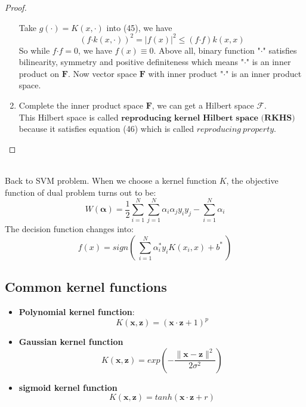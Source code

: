 \begin{proof}
\begin{enumerate}
      Take $g(\cdot)=K(x,\cdot)$ into (45), we have
      $$ (f\bm\cdot k(x,\cdot))^2=|f(x)|^2\leqslant(f\bm\cdot f)k(x,x) $$
      So while $f\bm\cdot f=0$, we have $f(x)\equiv 0$.
      Above all, binary function "$\bm\cdot$" satisfies bilinearity, symmetry and positive definiteness which means "$\bm\cdot$" is an inner product on $\bm{F}$. Now vector space $\bm{F}$ with inner product "$\bm\cdot$" is an inner product space.
   \item Complete the inner product space $\bm{F}$, we can get a Hilbert space $\mathscr{F}$.\\
      This Hilbert space is called $\textbf{reproducing\ kernel\ Hilbert\ space\ (RKHS)}$ because it satisfies equation (46) which is called $reproducing\ property$.
 \end{enumerate}
\end{proof}
\noindent\\
Back to SVM problem. When we choose a kernel function $K$, the objective function of dual problem turns out to be:
$$ W(\bm\alpha)=\frac{1}{2}\sum_{i=1}^{N}\sum_{j=1}^{N}\alpha_{i}\alpha_{j}y_{i}y_{j}-\sum_{i=1}^{N}\alpha_{i} $$
The decision function changes into:
$$ f(x)=sign(\ \sum_{i=1}^{N}\alpha_{i}^*y_{i}K(x_{i},x)+b^*\ ) $$

\subsection{Common kernel functions}
\begin{itemize}
  \item \textbf{Polynomial kernel function}:
        \begin{equation}
          K(\bm x,\bm z)=(\bm x\cdot \bm z+1)^{p}
        \end{equation}
  \item \textbf{Gaussian kernel function}
        \begin{equation}
          K(\bm x,\bm z)=exp(-\frac{\|\bm x-\bm z\|^2}{2\sigma^2})
        \end{equation}
  \item \textbf{sigmoid kernel function}
        \begin{equation}
          K(\bm x,\bm z)=tanh(\bm x\cdot \bm z+r)
        \end{equation}
\end{itemize}



%
